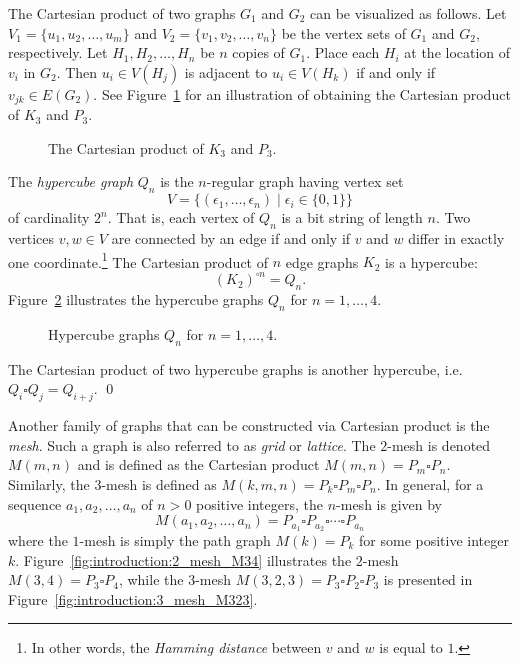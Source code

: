 The Cartesian product of two graphs $G_1$ and $G_2$ can be visualized
as follows. Let $V_1 = \{u_1, u_2, \dots, u_m\}$ and
$V_2 = \{v_1, v_2, \dots, v_n\}$ be the vertex sets of $G_1$ and
$G_2$, respectively. Let $H_1, H_2, \dots, H_n$ be $n$ copies of
$G_1$. Place each $H_i$ at the location of $v_i$ in $G_2$. Then
$u_i \in V(H_j)$ is adjacent to $u_i \in V(H_k)$ if and only if
$v_{jk} \in E(G_2)$. See
Figure~\ref{fig:introduction:Cartesian_product_K3_P3} for an
illustration of obtaining the Cartesian product of $K_3$ and $P_3$.

\begin{figure}[!htbp]
\centering

\caption{The Cartesian product of $K_3$ and $P_3$.}
\label{fig:introduction:Cartesian_product_K3_P3}
\end{figure}

The \emph{hypercube graph}
$Q_n$ is the $n$-regular graph having vertex set
\[
V
=
\big\{ (\epsilon_1,\dots,\epsilon_n) \;|\; \epsilon_i \in \{0,1\} \big\}
\]
of cardinality $2^n$. That is, each vertex of $Q_n$ is a bit string of
length $n$. Two vertices $v,w \in V$ are connected by an edge if and
only if $v$ and $w$ differ in exactly one coordinate.\footnote{
  In other words, the \emph{Hamming distance}
  between $v$ and $w$ is equal to $1$.
}
The Cartesian product of $n$ edge graphs $K_2$ is a hypercube:
\[
(K_2)^{\square n} = Q_n.
\]
Figure~\ref{fig:introduction:hypercube_graphs} illustrates the
hypercube graphs $Q_n$ for $n = 1,\dots,4$.

\begin{figure}[!htbp]
\centering

\caption{Hypercube graphs $Q_n$ for $n = 1,\dots,4$.}
\label{fig:introduction:hypercube_graphs}
\end{figure}

\begin{example}
\rm
The Cartesian product of two hypercube graphs is another
hypercube, i.e. $Q_i \square Q_j = Q_{i+j}$. \qed
\end{example}

Another family of graphs that can be constructed via Cartesian product
is the \emph{mesh}. Such a graph is also referred to as
\emph{grid} or \emph{lattice}. The $2$-mesh
is denoted $M(m,n)$ and is defined as the Cartesian product
$M(m,n) = P_m \square P_n$. Similarly, the $3$-mesh is defined as
$M(k,m,n) = P_k \square P_m \square P_n$. In general, for a sequence
$a_1, a_2, \dots, a_n$ of $n > 0$ positive integers, the $n$-mesh is
given by
\[
M(a_1, a_2, \dots, a_n)
=
P_{a_1} \square P_{a_2} \square \cdots \square P_{a_n}
\]
where the $1$-mesh is simply the path graph $M(k) = P_k$ for some
positive integer $k$. Figure~\ref{fig:introduction:2_mesh_M34}
illustrates the $2$-mesh $M(3,4) = P_3 \square P_4$, while the
$3$-mesh $M(3,2,3) = P_3 \square P_2 \square P_3$ is presented in
Figure~\ref{fig:introduction:3_mesh_M323}.

